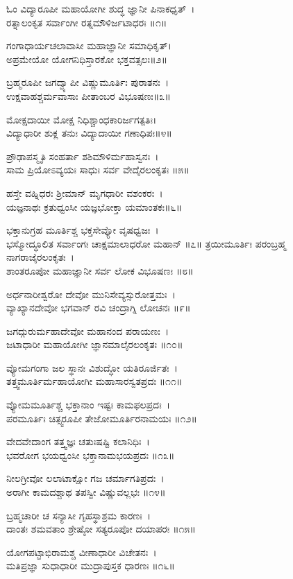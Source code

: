 ಓಂ ವಿದ್ಯಾರೂಪೀ ಮಹಾಯೋಗೀ ಶುದ್ಧ ಜ್ಞಾನೀ ಪಿನಾಕಧೃತ್~।\\
ರತ್ನಾಲಂಕೃತ ಸರ್ವಾಂಗೀ ರತ್ನಮೌಳಿರ್ಜಟಾಧರಃ ॥೧॥

ಗಂಗಾಧಾರ್ಯಚಲಾವಾಸೀ ಮಹಾಜ್ಞಾನೀ ಸಮಾಧಿಕೃತ್।\\
ಅಪ್ರಮೇಯೋ ಯೋಗನಿಧಿಸ್ತಾರಕೋ ಭಕ್ತವತ್ಸಲಃ॥೨॥

ಬ್ರಹ್ಮರೂಪೀ ಜಗದ್ವ್ಯಾಪೀ ವಿಷ್ಣುಮೂರ್ತಿಃ ಪುರಾತನಃ~।\\
ಉಕ್ಷವಾಹಶ್ಚರ್ಮವಾಸಾಃ ಪೀತಾಂಬರ ವಿಭೂಷಣಃ॥೩॥

ಮೋಕ್ಷದಾಯೀ ಮೋಕ್ಷ ನಿಧಿಶ್ಚಾಂಧಕಾರಿರ್ಜಗತ್ಪತಿಃ।\\
ವಿದ್ಯಾಧಾರೀ ಶುಕ್ಲ ತನುಃ ವಿದ್ಯಾದಾಯೀ ಗಣಾಧಿಪಃ॥೪॥

ಪ್ರೌಢಾಪಸ್ಮೃತಿ ಸಂಹರ್ತಾ ಶಶಿಮೌಳಿರ್ಮಹಾಸ್ವನಃ~।\\
ಸಾಮ ಪ್ರಿಯೋಽವ್ಯಯಃ ಸಾಧುಃ ಸರ್ವ ವೇದೈರಲಂಕೃತಃ ॥೫॥

ಹಸ್ತೇ ವಹ್ನಿಧರಃ ಶ್ರೀಮಾನ್ ಮೃಗಧಾರೀ ವಶಂಕರಃ~।\\
ಯಜ್ಞನಾಥಃ ಕ್ರತುಧ್ವಂಸೀ ಯಜ್ಞಭೋಕ್ತಾ ಯಮಾಂತಕಃ॥೬॥

ಭಕ್ತಾನುಗ್ರಹ ಮೂರ್ತಿಶ್ಚ ಭಕ್ತಸೇವ್ಯೋ ವೃಷಧ್ವಜಃ~।\\
ಭಸ್ಮೋದ್ಧೂಲಿತ ಸರ್ವಾಂಗಃ ಚಾಕ್ಷಮಾಲಾಧರೋ ಮಹಾನ್ ॥೭॥
\newpage
ತ್ರಯೀಮೂರ್ತಿಃ ಪರಂಬ್ರಹ್ಮ ನಾಗರಾಜೈರಲಂಕೃತಃ~।\\
ಶಾಂತರೂಪೋ ಮಹಾಜ್ಞಾನೀ ಸರ್ವ ಲೋಕ ವಿಭೂಷಣಃ ॥೮॥

ಅರ್ಧನಾರೀಶ್ವರೋ ದೇವೋ ಮುನಿಸೇವ್ಯಸ್ಸುರೋತ್ತಮಃ~।\\
ವ್ಯಾಖ್ಯಾನದೇವೋ ಭಗವಾನ್ ರವಿ ಚಂದ್ರಾಗ್ನಿ ಲೋಚನಃ ॥೯॥

ಜಗದ್ಗುರುರ್ಮಹಾದೇವೋ ಮಹಾನಂದ ಪರಾಯಣಃ~।\\
ಜಟಾಧಾರೀ ಮಹಾಯೋಗೀ ಜ್ಞಾನಮಾಲೈರಲಂಕೃತಃ ॥೧೦॥

ವ್ಯೋಮಗಂಗಾ ಜಲ ಸ್ಥಾನಃ ವಿಶುದ್ಧೋ ಯತಿರೂರ್ಜಿತಃ~।\\
ತತ್ತ್ವಮೂರ್ತಿರ್ಮಹಾಯೋಗೀ ಮಹಾಸಾರಸ್ವತಪ್ರದಃ ॥೧೧॥

ವ್ಯೋಮಮೂರ್ತಿಶ್ಚ ಭಕ್ತಾನಾಂ ಇಷ್ಟಃ ಕಾಮಫಲಪ್ರದಃ~।\\
ಪರಮೂರ್ತಿಃ ಚಿತ್ಸ್ವರೂಪೀ ತೇಜೋಮೂರ್ತಿರನಾಮಯಃ ॥೧೨॥

ವೇದವೇದಾಂಗ ತತ್ತ್ವಜ್ಞಃ ಚತುಃಷಷ್ಟಿ ಕಲಾನಿಧಿಃ~।\\
ಭವರೋಗ ಭಯಧ್ವಂಸೀ ಭಕ್ತಾನಾಮಭಯಪ್ರದಃ ॥೧೩॥

ನೀಲಗ್ರೀವೋ ಲಲಾಟಾಕ್ಷೋ ಗಜ ಚರ್ಮಾಗತಿಪ್ರದಃ~।\\
ಅರಾಗೀ ಕಾಮದಶ್ಚಾಥ ತಪಸ್ವೀ ವಿಷ್ಣುವಲ್ಲಭಃ ॥೧೪॥

ಬ್ರಹ್ಮಚಾರೀ ಚ ಸನ್ಯಾಸೀ ಗೃಹಸ್ಥಾಶ್ರಮ ಕಾರಣಃ~।\\
ದಾಂತಃ ಶಮವತಾಂ ಶ್ರೇಷ್ಠೋ ಸತ್ಯರೂಪೋ ದಯಾಪರಃ ॥೧೫॥

ಯೋಗಪಟ್ಟಾಭಿರಾಮಶ್ಚ ವೀಣಾಧಾರೀ ವಿಚೇತನಃ~।\\
ಮತಿಪ್ರಜ್ಞಾ ಸುಧಾಧಾರೀ ಮುದ್ರಾಪುಸ್ತಕ ಧಾರಣಃ ॥೧೬॥

